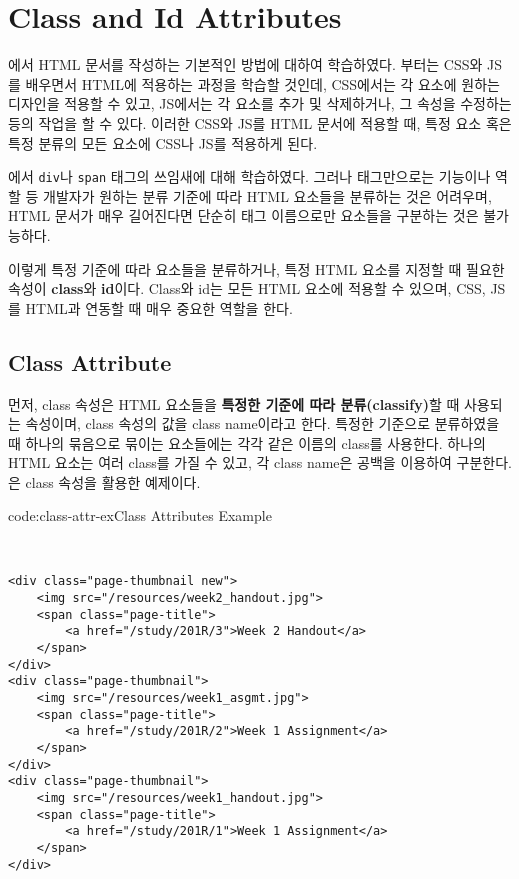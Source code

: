 \section{Class and Id Attributes} \label{sect:class-and-id-attributes}

에서 HTML 문서를 작성하는 기본적인 방법에 대하여 학습하였다. 부터는 CSS와 JS를 배우면서 HTML에 적용하는 과정을 학습할 것인데, CSS에서는 각 요소에 원하는 디자인을 적용할 수 있고, JS에서는 각 요소를 추가 및 삭제하거나, 그 속성을 수정하는 등의 작업을 할 수 있다. 이러한 CSS와 JS를 HTML 문서에 적용할 때, 특정 요소 혹은 특정 분류의 모든 요소에 CSS나 JS를 적용하게 된다.

에서 \texttt{div}나 \texttt{span} 태그의 쓰임새에 대해 학습하였다. 그러나 태그만으로는 기능이나 역할 등 개발자가 원하는 분류 기준에 따라 HTML 요소들을 분류하는 것은 어려우며, HTML 문서가 매우 길어진다면 단순히 태그 이름으로만 요소들을 구분하는 것은 불가능하다.

이렇게 특정 기준에 따라 요소들을 분류하거나, 특정 HTML 요소를 지정할 때 필요한 속성이 \textbf{class}와 \textbf{id}이다. Class와 id는 모든 HTML 요소에 적용할 수 있으며, CSS, JS를 HTML과 연동할 때 매우 중요한 역할을 한다. 

\subsection*{Class Attribute}
먼저, class 속성은 HTML 요소들을 \textbf{특정한 기준에 따라 분류(classify)}할 때 사용되는 속성이며, class 속성의 값을 class name이라고 한다. 특정한 기준으로 분류하였을 때 하나의 묶음으로 묶이는 요소들에는 각각 같은 이름의 class를 사용한다. 하나의 HTML 요소는 여러 class를 가질 수 있고, 각 class name은 공백을 이용하여 구분한다. 은 class 속성을 활용한 예제이다.

\begin{codeenv}{code:class-attr-ex}{Class Attributes Example}\begin{verbatim}


<div class="page-thumbnail new">
    <img src="/resources/week2_handout.jpg">
    <span class="page-title">
        <a href="/study/201R/3">Week 2 Handout</a>
    </span>
</div>
<div class="page-thumbnail">
    <img src="/resources/week1_asgmt.jpg">
    <span class="page-title">
        <a href="/study/201R/2">Week 1 Assignment</a>
    </span>
</div>
<div class="page-thumbnail">
    <img src="/resources/week1_handout.jpg">
    <span class="page-title">
        <a href="/study/201R/1">Week 1 Assignment</a>
    </span>
</div>
\end{verbatim}
\end{codeenv}
\newpage

